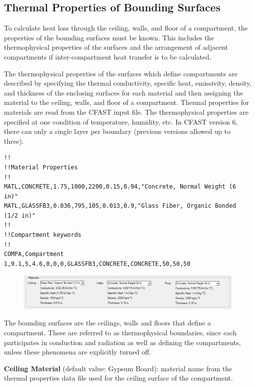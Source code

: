 \subsection{Thermal Properties of Bounding Surfaces}

To calculate heat loss through the ceiling, walls, and floor of a compartment, the properties of the bounding surfaces must be known. This includes the thermophysical properties of the surfaces and the arrangement of adjacent compartments if inter-compartment heat transfer is to be calculated.

The thermophysical properties of the surfaces which define compartments are described by specifying the thermal conductivity, specific heat, emissivity, density, and thickness of the enclosing surfaces for each material and then assigning the material to the ceiling, walls, and floor of a compartment.  Thermal properties for materials are read from the CFAST input file.  The thermophysical properties are specified at one condition of temperature, humidity, etc.  In CFAST version 6, there can only a single layer per boundary (previous versions allowed up to three).

\begin{lstlisting}
!!
!!Material Properties
!!
MATL,CONCRETE,1.75,1000,2200,0.15,0.94,"Concrete, Normal Weight (6 in)"
MATL,GLASSFB3,0.036,795,105,0.013,0.9,"Glass Fiber, Organic Bonded (1/2 in)"
!!
!!Compartment keywords
!!
COMPA,Compartment 1,9.1,5,4.6,0,0,0,GLASSFB3,CONCRETE,CONCRETE,50,50,50
\end{lstlisting}

\begin{figure}[h!]
\includegraphics[width=6.5in]{FIGURES/Input_File/Compartment_Materials}
\end{figure}

The bounding surfaces are the ceilings, walls and floors that define a compartment. These are referred to as thermophysical boundaries, since each participates in conduction and radiation as well as defining the compartments, unless these phenomena are explicitly turned off.

\textbf{Ceiling Material} (default value: Gypsum Board): material name from the thermal properties data file used for the ceiling surface of the compartment.

